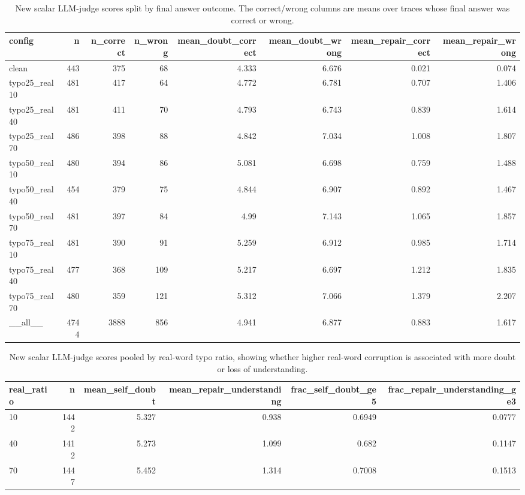 \documentclass[11pt]{article}
\begin{document}
\begin{table}[H]
\centering
\caption{New scalar LLM-judge scores split by final answer outcome. The correct/wrong columns are means over traces whose final answer was correct or wrong.}
\small
\begin{adjustbox}{max width=\textwidth}
\begin{tabular}{lrrrrrrr}
\toprule
\textbf{config} & \textbf{n} & \textbf{n\_correct} & \textbf{n\_wrong} & \textbf{mean\_doubt\_correct} & \textbf{mean\_doubt\_wrong} & \textbf{mean\_repair\_correct} & \textbf{mean\_repair\_wrong} \\
\midrule
clean & 443 & 375 & 68 & 4.333 & 6.676 & 0.021 & 0.074 \\
typo25\_real10 & 481 & 417 & 64 & 4.772 & 6.781 & 0.707 & 1.406 \\
typo25\_real40 & 481 & 411 & 70 & 4.793 & 6.743 & 0.839 & 1.614 \\
typo25\_real70 & 486 & 398 & 88 & 4.842 & 7.034 & 1.008 & 1.807 \\
typo50\_real10 & 480 & 394 & 86 & 5.081 & 6.698 & 0.759 & 1.488 \\
typo50\_real40 & 454 & 379 & 75 & 4.844 & 6.907 & 0.892 & 1.467 \\
typo50\_real70 & 481 & 397 & 84 & 4.99 & 7.143 & 1.065 & 1.857 \\
typo75\_real10 & 481 & 390 & 91 & 5.259 & 6.912 & 0.985 & 1.714 \\
typo75\_real40 & 477 & 368 & 109 & 5.217 & 6.697 & 1.212 & 1.835 \\
typo75\_real70 & 480 & 359 & 121 & 5.312 & 7.066 & 1.379 & 2.207 \\
\_\_all\_\_ & 4744 & 3888 & 856 & 4.941 & 6.877 & 0.883 & 1.617 \\
\bottomrule
\end{tabular}
\end{adjustbox}
\end{table}

\begin{table}[H]
\centering
\caption{New scalar LLM-judge scores pooled by real-word typo ratio, showing whether higher real-word corruption is associated with more doubt or loss of understanding.}
\small
\begin{adjustbox}{max width=\textwidth}
\begin{tabular}{lrrrrr}
\toprule
\textbf{real\_ratio} & \textbf{n} & \textbf{mean\_self\_doubt} & \textbf{mean\_repair\_understanding} & \textbf{frac\_self\_doubt\_ge5} & \textbf{frac\_repair\_understanding\_ge3} \\
\midrule
10 & 1442 & 5.327 & 0.938 & 0.6949 & 0.0777 \\
40 & 1412 & 5.273 & 1.099 & 0.682 & 0.1147 \\
70 & 1447 & 5.452 & 1.314 & 0.7008 & 0.1513 \\
\bottomrule
\end{tabular}
\end{adjustbox}
\end{table}
\end{document}
